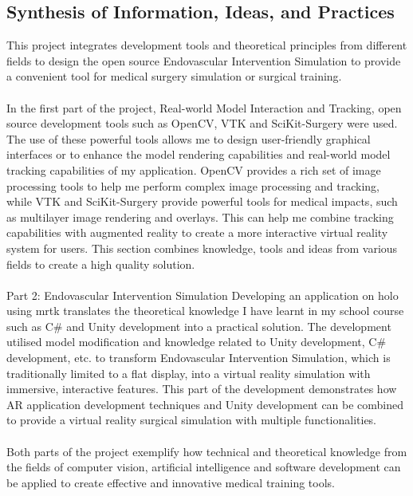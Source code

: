 \documentclass[12pt]{article}
\begin{document}
\subsection{Synthesis of Information, Ideas, and Practices}
This project integrates development tools and theoretical principles from different fields to design the open source Endovascular Intervention Simulation to provide a convenient tool for medical surgery simulation or surgical training.
\\\\
In the first part of the project, Real-world Model Interaction and Tracking, open source development tools such as OpenCV, VTK and SciKit-Surgery were used. The use of these powerful tools allows me to design user-friendly graphical interfaces or to enhance the model rendering capabilities and real-world model tracking capabilities of my application. OpenCV provides a rich set of image processing tools to help me perform complex image processing and tracking, while VTK and SciKit-Surgery provide powerful tools for medical impacts, such as multilayer image rendering and overlays. This can help me combine tracking capabilities with augmented reality to create a more interactive virtual reality system for users. This section combines knowledge, tools and ideas from various fields to create a high quality solution.
\\\\
Part 2: Endovascular Intervention Simulation Developing an application on \gls{holo} using \gls{mrtk} translates the theoretical knowledge I have learnt in my school course such as C\# and Unity development into a practical solution. The development utilised model modification and knowledge related to Unity development, C\# development, etc. to transform Endovascular Intervention Simulation, which is traditionally limited to a flat display, into a virtual reality simulation with immersive, interactive features. This part of the development demonstrates how AR application development techniques and Unity development can be combined to provide a virtual reality surgical simulation with multiple functionalities.
\\\\
Both parts of the project exemplify how technical and theoretical knowledge from the fields of computer vision, artificial intelligence and software development can be applied to create effective and innovative medical training tools.
\end{document}

